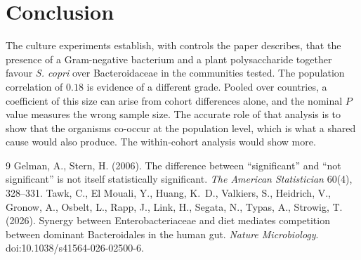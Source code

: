 \documentclass[11pt]{article}
\theoremstyle{definition}
\begin{document}
\section{Conclusion}

The culture experiments establish, with controls the paper describes, that the presence of a Gram-negative bacterium and a plant polysaccharide together favour \emph{S. copri} over Bacteroidaceae in the communities tested. The population correlation of $0.18$ is evidence of a different grade. Pooled over countries, a coefficient of this size can arise from cohort differences alone, and the nominal $P$ value measures the wrong sample size. The accurate role of that analysis is to show that the organisms co-occur at the population level, which is what a shared cause would also produce. The within-cohort analysis would show more.

\begin{thebibliography}{9}
 Gelman, A., Stern, H. (2006). The difference between ``significant'' and ``not significant'' is not itself statistically significant. \emph{The American Statistician} 60(4), 328--331.
 Tawk, C., El Mouali, Y., Huang, K.~D., Valkiers, S., Heidrich, V., Gronow, A., Osbelt, L., Rapp, J., Link, H., Segata, N., Typas, A., Strowig, T. (2026). Synergy between Enterobacteriaceae and diet mediates competition between dominant Bacteroidales in the human gut. \emph{Nature Microbiology}. doi:10.1038/s41564-026-02500-6.
\end{thebibliography}
\end{document}
